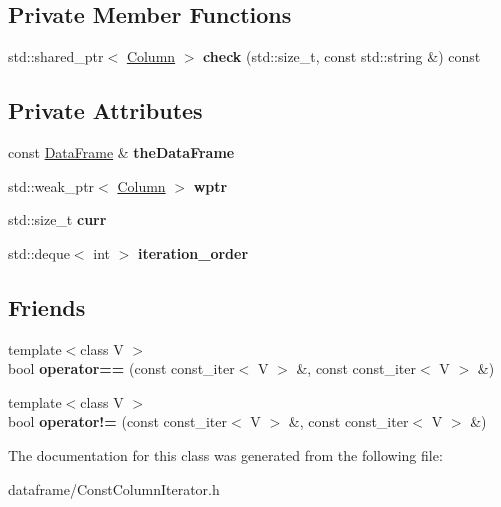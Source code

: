 \subsection*{Private Member Functions}
\begin{DoxyCompactItemize}
\item 
\mbox{\label{classDataFrame_1_1ConstColumnIterator_ad7dca2259015130616cb052e6997ba70}} 
std\+::shared\+\_\+ptr$<$ \hyperlink{classColumn}{Column} $>$ {\bfseries check} (std\+::size\+\_\+t, const std\+::string \&) const
\end{DoxyCompactItemize}
\subsection*{Private Attributes}
\begin{DoxyCompactItemize}
\item 
\mbox{\label{classDataFrame_1_1ConstColumnIterator_a9f8b079e45b708072aa9eec8ff4c7b98}} 
const \hyperlink{classDataFrame}{Data\+Frame} \& {\bfseries the\+Data\+Frame}
\item 
\mbox{\label{classDataFrame_1_1ConstColumnIterator_ae4a28de973f2e243ca9a0f0b0523d95a}} 
std\+::weak\+\_\+ptr$<$ \hyperlink{classColumn}{Column} $>$ {\bfseries wptr}
\item 
\mbox{\label{classDataFrame_1_1ConstColumnIterator_a50d3d59e14b5ca2d4f2982d799f0100d}} 
std\+::size\+\_\+t {\bfseries curr}
\item 
\mbox{\label{classDataFrame_1_1ConstColumnIterator_aa715367fc8fdb11374b5baf076c2c9c2}} 
std\+::deque$<$ int $>$ {\bfseries iteration\+\_\+order}
\end{DoxyCompactItemize}
\subsection*{Friends}
\begin{DoxyCompactItemize}
\item 
\mbox{\label{classDataFrame_1_1ConstColumnIterator_a296e4ef4f1f9cf5dcc7b37059c80176f}} 
{\footnotesize template$<$class V $>$ }\\bool {\bfseries operator==} (const const\+\_\+iter$<$ V $>$ \&, const const\+\_\+iter$<$ V $>$ \&)
\item 
\mbox{\label{classDataFrame_1_1ConstColumnIterator_aeb3fca876f6e8343e6a0fa8ec2532fe2}} 
{\footnotesize template$<$class V $>$ }\\bool {\bfseries operator!=} (const const\+\_\+iter$<$ V $>$ \&, const const\+\_\+iter$<$ V $>$ \&)
\end{DoxyCompactItemize}


The documentation for this class was generated from the following file\+:\begin{DoxyCompactItemize}
\item 
dataframe/Const\+Column\+Iterator.\+h\end{DoxyCompactItemize}
